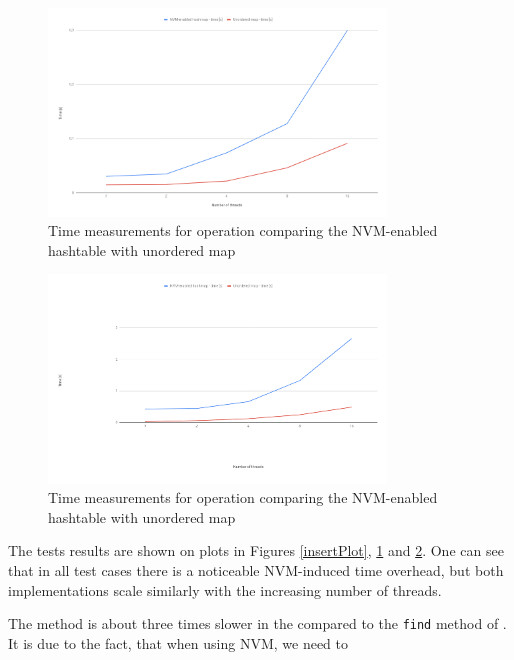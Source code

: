     \begin{figure}[ht]
        \centering
        \includegraphics[width=0.8\textwidth]{thesis/figures/get.png}
        \caption{Time measurements for \getMethod operation comparing the NVM-enabled hashtable with unordered map}
        \label{getPlot}
    \end{figure}
    
    \begin{figure}[ht]
        \centering
        \includegraphics[width=0.8\textwidth]{thesis/figures/remove.png}
        \caption{Time measurements for \removeMethod operation comparing the NVM-enabled hashtable with unordered map}
        \label{removePlot}
    \end{figure}
    
    
    The tests results are shown on plots in Figures \ref{insertPlot}, \ref{getPlot} and \ref{removePlot}. One can see that in all test cases there is a noticeable NVM-induced time overhead, but both implementations scale similarly with the increasing number of threads. 
    
    The \getMethod method is about three times slower in the \NvmHashMap compared to the \texttt{find} method of \unorderedMap. It is due to the fact, that when using NVM, we need to 
    

